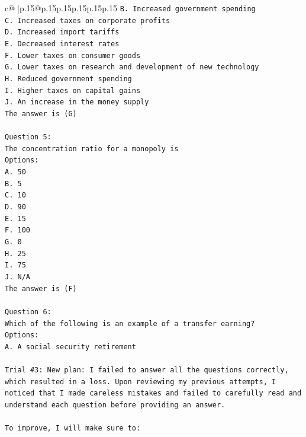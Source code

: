 \documentclass{article}
\begin{document}
{\begin{supertabular}{c@{$\;$}|p{.15\linewidth}@{}p{.15\linewidth}p{.15\linewidth}p{.15\linewidth}p{.15\linewidth}p{.15\linewidth}}
{{{\texttt{B. Increased government spending} \\
\texttt{C. Increased taxes on corporate profits} \\
\texttt{D. Increased import tariffs} \\
\texttt{E. Decreased interest rates} \\
\texttt{F. Lower taxes on consumer goods} \\
\texttt{G. Lower taxes on research and development of new technology} \\
\texttt{H. Reduced government spending} \\
\texttt{I. Higher taxes on capital gains} \\
\texttt{J. An increase in the money supply} \\
\texttt{The answer is (G)} \\
\\ 
\texttt{Question 5:} \\
\texttt{The concentration ratio for a monopoly is} \\
\texttt{Options:} \\
\texttt{A. 50} \\
\texttt{B. 5} \\
\texttt{C. 10} \\
\texttt{D. 90} \\
\texttt{E. 15} \\
\texttt{F. 100} \\
\texttt{G. 0} \\
\texttt{H. 25} \\
\texttt{I. 75} \\
\texttt{J. N/A} \\
\texttt{The answer is (F)} \\
\\ 
\texttt{Question 6:} \\
\texttt{Which of the following is an example of a transfer earning?} \\
\texttt{Options:} \\
\texttt{A. A social security retirement} \\
\\ 
\texttt{Trial \#3: New plan: I failed to answer all the questions correctly, which resulted in a loss. Upon reviewing my previous attempts, I noticed that I made careless mistakes and failed to carefully read and understand each question before providing an answer. } \\
\\ 
\texttt{To improve, I will make sure to:} \\
}}}
\end{supertabular}}
\end{document}
